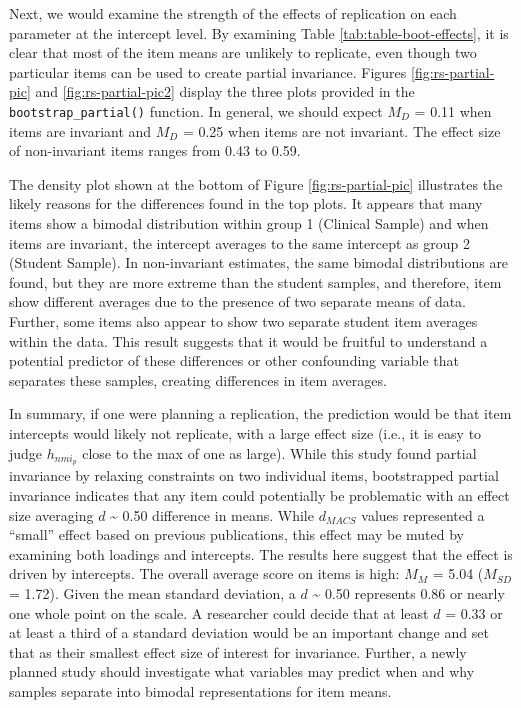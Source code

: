 \documentclass[
  man]{apa7}
\begin{document}
Next, we would examine the strength of the effects of replication on each parameter at the intercept level. By examining Table \ref{tab:table-boot-effects}, it is clear that most of the item means are unlikely to replicate, even though two particular items can be used to create partial invariance. Figures \ref{fig:rs-partial-pic} and \ref{fig:rs-partial-pic2} display the three plots provided in the \texttt{bootstrap\_partial()} function. In general, we should expect \(M_{D}\) = 0.11 when items are invariant and \(M_{D}\) = 0.25 when items are not invariant. The effect size of non-invariant items ranges from 0.43 to 0.59.

The density plot shown at the bottom of Figure \ref{fig:rs-partial-pic} illustrates the likely reasons for the differences found in the top plots. It appears that many items show a bimodal distribution within group 1 (Clinical Sample) and when items are invariant, the intercept averages to the same intercept as group 2 (Student Sample). In non-invariant estimates, the same bimodal distributions are found, but they are more extreme than the student samples, and therefore, item show different averages due to the presence of two separate means of data. Further, some items also appear to show two separate student item averages within the data. This result suggests that it would be fruitful to understand a potential predictor of these differences or other confounding variable that separates these samples, creating differences in item averages.

In summary, if one were planning a replication, the prediction would be that item intercepts would likely not replicate, with a large effect size (i.e., it is easy to judge \(h_{nmi_p}\) close to the max of one as large). While this study found partial invariance by relaxing constraints on two individual items, bootstrapped partial invariance indicates that any item could potentially be problematic with an effect size averaging \(d\) \textasciitilde{} 0.50 difference in means. While \(d_{MACS}\) values represented a ``small'' effect based on previous publications, this effect may be muted by examining both loadings and intercepts. The results here suggest that the effect is driven by intercepts. The overall average score on items is high: \(M_M\) = 5.04 (\(M_{SD}\) = 1.72). Given the mean standard deviation, a \(d\) \textasciitilde{} 0.50 represents 0.86 or nearly one whole point on the scale. A researcher could decide that at least \(d\) = 0.33 or at least a third of a standard deviation would be an important change and set that as their smallest effect size of interest for invariance. Further, a newly planned study should investigate what variables may predict when and why samples separate into bimodal representations for item means.
\end{document}
